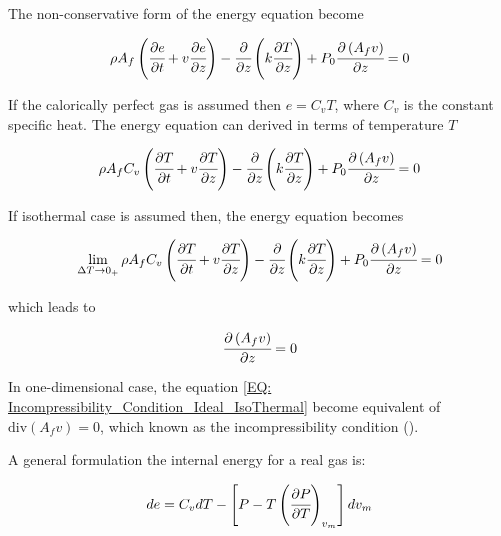 \documentclass[../Article_Model_Parameters.tex]{subfiles}
\begin{document}
	The non-conservative form of the energy equation become
	
	{\footnotesize
		\begin{equation*}
		\rho A_f \left( \cfrac{\partial e }{\partial t} + v \cfrac{\partial e}{\partial z} \right) - \cfrac{\partial}{\partial z} \left( k \cfrac{\partial T}{\partial z} \right) + P_0 \cfrac{\partial \left(A_f v\right)}{\partial z} = 0
		\end{equation*}
	}
	
	If the calorically perfect gas is assumed then $e=C_vT$, where $C_v$ is the constant specific heat. The energy equation can derived in terms of temperature $T$
	
	{\footnotesize
		\begin{equation*}
			\rho A_f C_v \left( \cfrac{\partial T }{\partial t} + v \cfrac{\partial T}{\partial z} \right) - \cfrac{\partial}{\partial z} \left( k \cfrac{\partial T}{\partial z} \right) + P_0 \cfrac{\partial \left(A_f v\right)}{\partial z} = 0
		\end{equation*}
	}
	
	If isothermal case is assumed then, the energy equation becomes
	
	{\footnotesize
		\begin{equation*}
			\lim_{\Delta T \rightarrow 0_+} \rho A_f C_v \left( \cfrac{\partial T }{\partial t} + v \cfrac{\partial T}{\partial z} \right) - \cfrac{\partial}{\partial z} \left( k \cfrac{\partial T}{\partial z} \right) + P_0 \cfrac{\partial \left(A_f v\right)}{\partial z} = 0
		\end{equation*}
	}
	
	which leads to
	
	{\footnotesize
		\begin{equation}
			\cfrac{\partial \left(A_f v\right)}{\partial z} = 0
			\label{EQ: Incompressibility_Condition_Ideal_IsoThermal}
		\end{equation}
	}
	
	In one-dimensional case, the equation \ref{EQ: Incompressibility_Condition_Ideal_IsoThermal} become equivalent of $\text{div} ( A_f v) = 0$, which known as the incompressibility condition (\citet{Lions2013}). 
	
		A general formulation the internal energy for a real gas is:
	
	{\footnotesize
		\begin{equation*}
			de=C_vdT-\left[P-T\left(\cfrac{\partial P}{\partial T}\right)_{v_m}\right]dv_m
	\end{equation*} }
	
\end{document}
